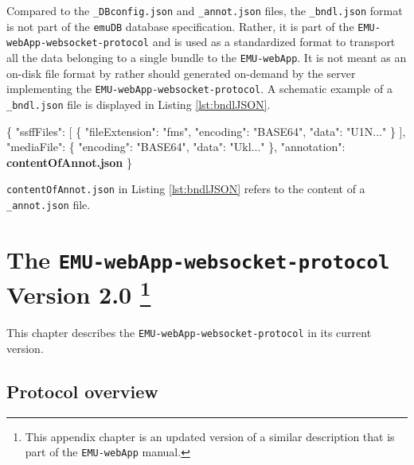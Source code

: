 \documentclass[]{book}
\newenvironment{Shaded}{\begin{snugshade}}{\end{snugshade}}
\newcommand{\DataTypeTok}[1]{\textcolor[rgb]{0.13,0.29,0.53}{#1}}
\newcommand{\ErrorTok}[1]{\textcolor[rgb]{0.64,0.00,0.00}{\textbf{#1}}}
\newcommand{\FunctionTok}[1]{\textcolor[rgb]{0.00,0.00,0.00}{#1}}
\newcommand{\OtherTok}[1]{\textcolor[rgb]{0.56,0.35,0.01}{#1}}
\newcommand{\StringTok}[1]{\textcolor[rgb]{0.31,0.60,0.02}{#1}}
\let\rmarkdownfootnote\footnote%
\def\footnote{\protect\rmarkdownfootnote}
\theoremstyle{definition}
\theoremstyle{definition}
\theoremstyle{definition}
\theoremstyle{remark}
\begin{document}
Compared to the \texttt{\_DBconfig.json} and \texttt{\_annot.json}
files, the \texttt{\_bndl.json} format is not part of the \texttt{emuDB}
database specification. Rather, it is part of the
\texttt{EMU-webApp-websocket-protocol} and is used as a standardized
format to transport all the data belonging to a single bundle to the
\texttt{EMU-webApp}. It is not meant as an on-disk file format by rather
should generated on-demand by the server implementing the
\texttt{EMU-webApp-websocket-protocol}. A schematic example of a
\texttt{\_bndl.json} file is displayed in Listing \ref{lst:bndlJSON}.

\begin{Shaded}
\begin{Highlighting}[]
\FunctionTok{\{}
 \DataTypeTok{"ssffFiles"}\FunctionTok{:} \OtherTok{[}
  \FunctionTok{\{}
   \DataTypeTok{"fileExtension"}\FunctionTok{:} \StringTok{"fms"}\FunctionTok{,}
   \DataTypeTok{"encoding"}\FunctionTok{:} \StringTok{"BASE64"}\FunctionTok{,}
   \DataTypeTok{"data"}\FunctionTok{:} \StringTok{"U1N..."}
  \FunctionTok{\}}
 \OtherTok{]}\FunctionTok{,}
 \DataTypeTok{"mediaFile"}\FunctionTok{:} \FunctionTok{\{}
  \DataTypeTok{"encoding"}\FunctionTok{:} \StringTok{"BASE64"}\FunctionTok{,}
  \DataTypeTok{"data"}\FunctionTok{:} \StringTok{"Ukl..."}
 \FunctionTok{\},}
 \DataTypeTok{"annotation"}\FunctionTok{:} \ErrorTok{contentOfAnnot.json}
\FunctionTok{\}}
\end{Highlighting}
\end{Shaded}

\texttt{contentOfAnnot.json} in Listing \ref{lst:bndlJSON} refers to the
content of a \texttt{\_annot.json} file.

\hypertarget{app-chap:wsProtocol}{%
\chapter[The \texttt{EMU-webApp-websocket-protocol} Version 2.0
]{\texorpdfstring{The \texttt{EMU-webApp-websocket-protocol} Version 2.0
\footnote{This appendix chapter is an updated version of a similar
  description that is part of the \texttt{EMU-webApp} manual.}}{The EMU-webApp-websocket-protocol Version 2.0 }}\label{app-chap:wsProtocol}}

This chapter describes the \texttt{EMU-webApp-websocket-protocol} in its
current version.

\hypertarget{protocol-overview}{%
\section{Protocol overview}\label{protocol-overview}}
\end{document}

